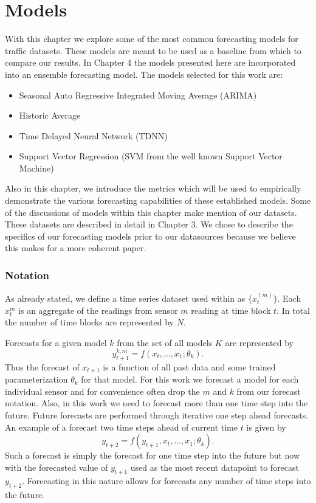\chapter{Models}
With this chapter we explore some of the most common forecasting models for traffic datasets.  These models are meant to be used as a baseline from which to compare our results.  In Chapter 4 the models presented here are incorporated into an ensemble forecasting model.  The models selected for this work are:

\begin{itemize}
	\item Seasonal Auto Regressive Integrated Moving Average (ARIMA)
	\item Historic Average
	\item Time Delayed Neural Network (TDNN)
	\item Support Vector Regression (SVM from the well known Support Vector Machine)
\end{itemize}

Also in this chapter, we introduce the metrics which will be used to empirically demonstrate the various forecasting capabilities of these established models.  Some of the discussions of models within this chapter make mention of our datasets.  These datasets are described in detail in Chapter 3.  We chose to describe the specifics of our forecasting models prior to our datasources because we believe this makes for a more coherent paper.

\subsection{Notation}
As already stated, we define a time series dataset used within as  $\{x_{t}^{(m)}\}$.  Each $x_{t}^{m}$ is an aggregate of the readings from sensor $m$ reading at time block $t$.  In total the number of time blocks are represented by $N$.

Forecasts for a given model $k$ from the set of all models $K$ are represented by 
\begin{equation}
y_{t + 1}^{k, m} = f(x_{t}, ..., x_{1}; \theta_{k}).
\end{equation}
\noindent
Thus the forecast of $x_{t + 1}$ is a function of all past data and some trained parameterization $\theta_{k}$ for that model.  For this work we forecast a model for each individual sensor and for convenience often drop the $m$ and $k$ from our forecast notation.  Also, in this work we need to forecast more than one time step into the future.  Future forecasts are performed through iterative one step ahead forecasts.    An example of a forecast two time steps ahead of current time $t$ is given by 
\begin{equation}
y_{t + 2} = f(y_{t + 1}, x_{t}, ..., x_{1}; \theta_{k}).
\end{equation}
\noindent
Such a forecast is simply the forecast for one time step into the future but now with the forecasted value of $y_{t + 1}$ used as the most recent datapoint to forecast $y_{t + 2}$.  Forecasting in this nature allows for forecasts any number of time steps into the future.

